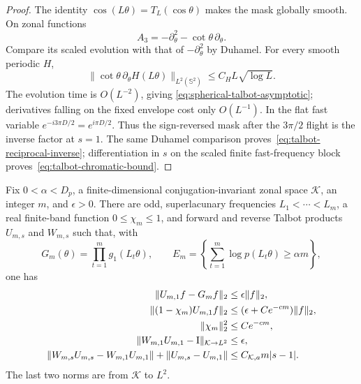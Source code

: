 \begin{proof}
The identity $\cos(L\theta)=T_L(\cos\theta)$ makes the mask globally smooth.
On zonal functions
\begin{equation}
 A_3=-\partial_\theta^2-\cot\theta\,\partial_\theta.
\end{equation}
Compare its scaled evolution with that of $-\partial_\theta^2$ by Duhamel.
For every smooth periodic $H$,
\begin{equation}
 \|\cot\theta\,\partial_\theta H(L\theta)\|_{L^2(\mathbb S^2)}
 \leq C_H L\sqrt{\log L}.
\end{equation}
The evolution time is $O(L^{-2})$, giving
\eqref{eq:spherical-talbot-asymptotic}; derivatives falling on the fixed
envelope cost only $O(L^{-1})$.  In the flat fast variable
$e^{-i3\pi D/2}=e^{i\pi D/2}$.  Thus the sign-reversed mask after the
$3\pi/2$ flight is the inverse factor at $s=1$.  The same Duhamel comparison
proves~\eqref{eq:talbot-reciprocal-inverse}; differentiation in $s$ on the
scaled finite fast-frequency block proves~\eqref{eq:talbot-chromatic-bound}.
\end{proof}

\begin{proposition}
\label{prop:talbot-riesz-concentration}
Fix $0<\alpha<D_p$, a finite-dimensional conjugation-invariant zonal space
$\mathcal K$, an integer $m$, and $\epsilon>0$.  There are odd,
superlacunary frequencies $L_1<\cdots<L_m$, a real finite-band function
$0\leq\chi_m\leq1$, and forward and reverse Talbot products $U_{m,s}$ and
$W_{m,s}$ such that, with
\begin{equation}
 G_m(\theta)=\prod_{t=1}^m g_1(L_t\theta),\qquad
 E_m=\left\{\sum_{t=1}^m\log p(L_t\theta)\geq\alpha m\right\},
 \label{eq:riesz-product-typical-set}
\end{equation}
one has
\begin{align}
 \|U_{m,1}f-G_mf\|_2
 &\leq\epsilon\|f\|_2,
 \label{eq:riesz-forward-approximation}\\
 \|(1-\chi_m)U_{m,1}f\|_2
 &\leq(\epsilon+Ce^{-cm})\|f\|_2,
 \label{eq:riesz-concentration}\\
 \|\chi_m\|_2^2&\leq Ce^{-cm},
 \label{eq:riesz-small-support-cost}\\
 \|W_{m,1}U_{m,1}-\mathrm I\|_{\mathcal K\to L^2}
 &\leq\epsilon,
 \label{eq:riesz-refocusing}\\
 \|W_{m,s}U_{m,s}-W_{m,1}U_{m,1}\|
 +\|U_{m,s}-U_{m,1}\|
 &\leq C_{\mathcal K,a}m|s-1|.
 \label{eq:riesz-chromatic-error}
\end{align}
The last two norms are from $\mathcal K$ to $L^2$.
\end{proposition}

